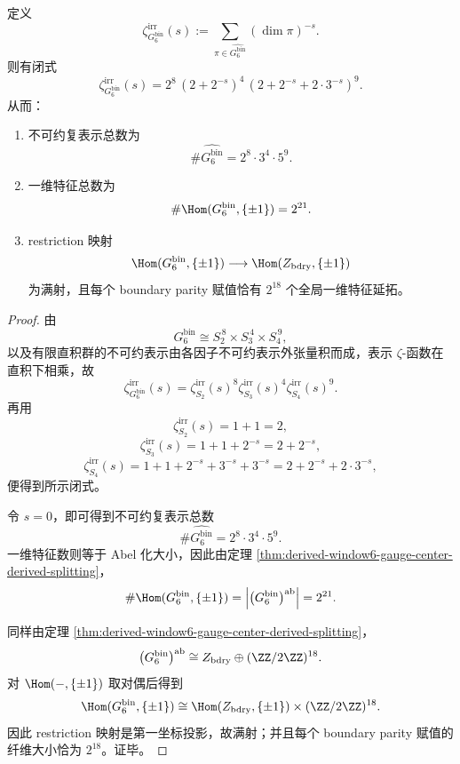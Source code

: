 \begin{theorem}\label{thm:derived-window6-representation-zeta-boundary-extension}
定义
\[
\zeta_{G_6^{\mathrm{bin}}}^{\mathrm{irr}}(s)
:=
\sum_{\pi\in \widehat{G_6^{\mathrm{bin}}}}(\dim\pi)^{-s}.
\]
则有闭式
\[
\zeta_{G_6^{\mathrm{bin}}}^{\mathrm{irr}}(s)
=
2^8\,(2+2^{-s})^4\,(2+2^{-s}+2\cdot 3^{-s})^9.
\]
从而：
\begin{enumerate}
  \item 不可约复表示总数为
  \[
  \#\widehat{G_6^{\mathrm{bin}}}=2^8\cdot 3^4\cdot 5^9.
  \]
  \item 一维特征总数为
  \[
  \#\Hom(G_6^{\mathrm{bin}},\{\pm 1\})=2^{21}.
  \]
  \item restriction 映射
  \[
  \Hom(G_6^{\mathrm{bin}},\{\pm 1\})
  \longrightarrow
  \Hom(Z_{\mathrm{bdry}},\{\pm 1\})
  \]
  为满射，且每个 boundary parity 赋值恰有 \(2^{18}\) 个全局一维特征延拓。
\end{enumerate}
\end{theorem}
\begin{proof}
由
\[
G_6^{\mathrm{bin}}\cong S_2^{\,8}\times S_3^{\,4}\times S_4^{\,9},
\]
以及有限直积群的不可约表示由各因子不可约表示外张量积而成，表示 \(\zeta\)-函数在直积下相乘，故
\[
\zeta_{G_6^{\mathrm{bin}}}^{\mathrm{irr}}(s)
=
\zeta_{S_2}^{\mathrm{irr}}(s)^8
\zeta_{S_3}^{\mathrm{irr}}(s)^4
\zeta_{S_4}^{\mathrm{irr}}(s)^9.
\]
再用
\[
\zeta_{S_2}^{\mathrm{irr}}(s)=1+1=2,
\]
\[
\zeta_{S_3}^{\mathrm{irr}}(s)=1+1+2^{-s}=2+2^{-s},
\]
\[
\zeta_{S_4}^{\mathrm{irr}}(s)=1+1+2^{-s}+3^{-s}+3^{-s}=2+2^{-s}+2\cdot 3^{-s},
\]
便得到所示闭式。

令 \(s=0\)，即可得到不可约复表示总数
\[
\#\widehat{G_6^{\mathrm{bin}}}
=
2^8\cdot 3^4\cdot 5^9.
\]
一维特征数则等于 Abel 化大小，因此由定理 \ref{thm:derived-window6-gauge-center-derived-splitting}，
\[
\#\Hom(G_6^{\mathrm{bin}},\{\pm 1\})
=
\left|\bigl(G_6^{\mathrm{bin}}\bigr)^{\mathrm{ab}}\right|
=
2^{21}.
\]

同样由定理 \ref{thm:derived-window6-gauge-center-derived-splitting}，
\[
\bigl(G_6^{\mathrm{bin}}\bigr)^{\mathrm{ab}}
\cong
Z_{\mathrm{bdry}}\oplus (\ZZ/2\ZZ)^{18}.
\]
对 \(\Hom(-,\{\pm 1\})\) 取对偶后得到
\[
\Hom(G_6^{\mathrm{bin}},\{\pm 1\})
\cong
\Hom(Z_{\mathrm{bdry}},\{\pm 1\})\times (\ZZ/2\ZZ)^{18}.
\]
因此 restriction 映射是第一坐标投影，故满射；并且每个 boundary parity 赋值的纤维大小恰为 \(2^{18}\)。证毕。
\end{proof}

